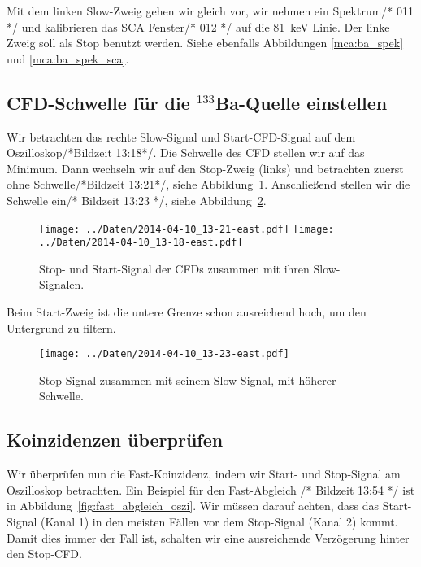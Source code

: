 Mit dem linken Slow-Zweig gehen wir gleich vor, wir nehmen ein Spektrum/* 011
*/ und kalibrieren das SCA Fenster/* 012 */ auf die \SI{81}{\kilo\electronvolt}
Linie. Der linke Zweig soll als Stop benutzt werden. Siehe ebenfalls Abbildungen \ref{mca:ba_spek} und \ref{mca:ba_spek_sca}.

\subsection{CFD-Schwelle für die ${}^{133}$Ba-Quelle einstellen}

Wir betrachten das rechte Slow-Signal und Start-CFD-Signal auf dem
Oszilloskop/*Bildzeit 13:18*/. Die Schwelle des CFD stellen wir auf das
Minimum. Dann wechseln wir auf den Stop-Zweig (links) und betrachten zuerst
ohne Schwelle/*Bildzeit 13:21*/, siehe
Abbildung~\ref{fig:ba_start_slow_baseline}. Anschließend stellen wir die
Schwelle ein/* Bildzeit 13:23 */, siehe Abbildung~\ref{fig:ba_start_slow}.

\begin{figure}[htbp]
    \centering
    \texttt{[image: ../Daten/2014-04-10\_13-21-east.pdf]}
    \hfill
    \texttt{[image: ../Daten/2014-04-10\_13-18-east.pdf]}
    \caption{%
        Stop- und Start-Signal der CFDs zusammen mit ihren Slow-Signalen.
    }
    \label{fig:ba_start_slow_baseline}
\end{figure}

Beim Start-Zweig ist die untere Grenze schon ausreichend hoch, um den
Untergrund zu filtern.

\begin{figure}[htbp]
    \texttt{[image: ../Daten/2014-04-10\_13-23-east.pdf]}
    \caption{%
        Stop-Signal zusammen mit seinem Slow-Signal, mit höherer Schwelle.
    }
    \label{fig:ba_start_slow}
\end{figure}

\subsection{Koinzidenzen überprüfen}

Wir überprüfen nun die Fast-Koinzidenz, indem wir Start- und Stop-Signal am
Oszilloskop betrachten. Ein Beispiel für den Fast-Abgleich /* Bildzeit 13:54 */
ist in Abbildung~\ref{fig:fast_abgleich_oszi}. Wir müssen darauf achten, dass
das Start-Signal (Kanal 1) in den meisten Fällen vor dem Stop-Signal (Kanal 2)
kommt. Damit dies immer der Fall ist, schalten wir eine ausreichende
Verzögerung hinter den Stop-CFD.

